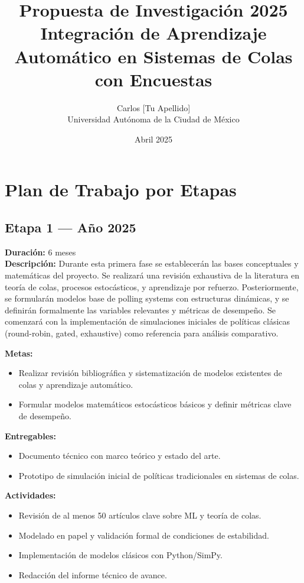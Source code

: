 \documentclass[12pt]{article}
\title{Propuesta de Investigación 2025\\Integración de Aprendizaje Automático en Sistemas de Colas con Encuestas}
\author{Carlos [Tu Apellido]\\Universidad Autónoma de la Ciudad de México}
\date{Abril 2025}
\begin{document}
\maketitle


\section*{Plan de Trabajo por Etapas}

\subsection*{Etapa 1 — Año 2025}
\textbf{Duración:} 6 meses\\
\textbf{Descripción:} Durante esta primera fase se establecerán las bases conceptuales y matemáticas del proyecto. Se realizará una revisión exhaustiva de la literatura en teoría de colas, procesos estocásticos, y aprendizaje por refuerzo. Posteriormente, se formularán modelos base de polling systems con estructuras dinámicas, y se definirán formalmente las variables relevantes y métricas de desempeño. Se comenzará con la implementación de simulaciones iniciales de políticas clásicas (round-robin, gated, exhaustive) como referencia para análisis comparativo.

\textbf{Metas:}
\begin{itemize}
  \item Realizar revisión bibliográfica y sistematización de modelos existentes de colas y aprendizaje automático.
  \item Formular modelos matemáticos estocásticos básicos y definir métricas clave de desempeño.
\end{itemize}

\textbf{Entregables:}
\begin{itemize}
  \item Documento técnico con marco teórico y estado del arte.
  \item Prototipo de simulación inicial de políticas tradicionales en sistemas de colas.
\end{itemize}

\textbf{Actividades:}
\begin{itemize}
  \item Revisión de al menos 50 artículos clave sobre ML y teoría de colas.
  \item Modelado en papel y validación formal de condiciones de estabilidad.
  \item Implementación de modelos clásicos con Python/SimPy.
  \item Redacción del informe técnico de avance.
\end{itemize}
\end{document}
